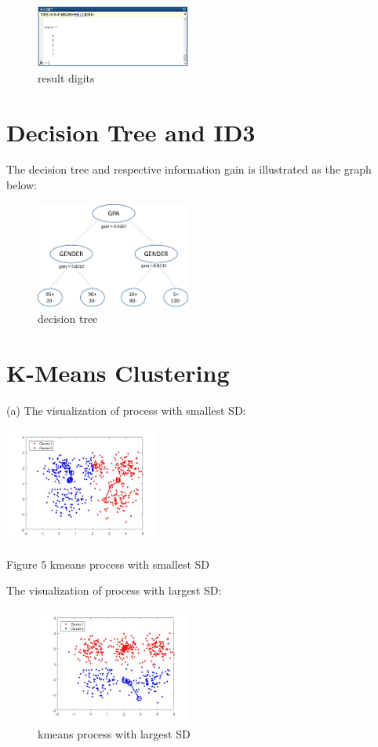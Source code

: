 \documentclass[11pt]{article} %
\begin{document}
\begin{figure}
\centering
\includegraphics[width=2in]{knn_resultdigits.jpg}  %
\caption{result digits}
\label{fig6}
\end{figure}


\section{Decision Tree and ID3}
The decision tree and respective information gain is illustrated as the graph below:

\begin{figure}[h]
\centering
\includegraphics[width=2in]{tree.png}  %
\caption{decision tree}
\label{fig4}
\end{figure}

\section{K-Means Clustering}

(a) The visualization of process with smallest SD:
\begin{center}
\includegraphics[width=2in]{kmeans_min.jpg}  %

Figure 5 kmeans process with smallest SD
\end{center}



The visualization of process with largest SD:
\begin{figure}[h]
\centering
\includegraphics[width=2in]{kmeans_max.jpg}  %
\caption{kmeans process with largest SD}
\label{fig4}
\end{figure}
\end{document}
